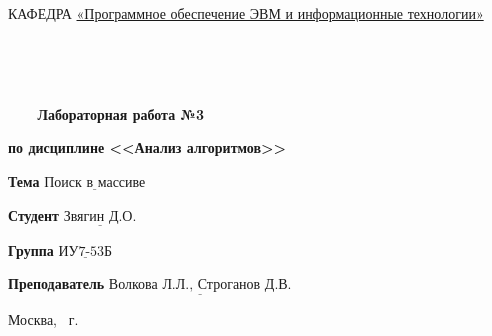 \begin{titlepage}
\noindent КАФЕДРА \underline{«Программное обеспечение ЭВМ и информационные технологии»}

\

\

\begin{center}
\noindent\begin{minipage}{1.0\textwidth}\centering
\Large\textbf{   ~~~ Лабораторная работа №3}

\textbf{по дисциплине <<Анализ алгоритмов>>}

\end{minipage}
\end{center}
\noindent\textbf{Тема} $\underline{\text{Поиск в массиве}}$

\noindent\textbf{Студент} $\underline{\text{Звягин Д.О.}}$

\noindent\textbf{Группа} $\underline{\text{ИУ7-53Б}}$

\noindent\textbf{Преподаватель} $\underline{\text{Волкова Л.Л., Строганов Д.В.}}$

\begin{center}
\mbox{}
\vfill
Москва, \the\year ~г.
\end{center}
\clearpage
\end{titlepage}